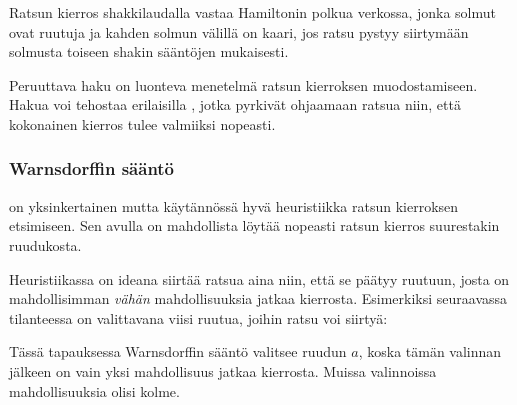 Ratsun kierros shakkilaudalla vastaa Hamiltonin polkua verkossa,
jonka solmut ovat ruutuja ja kahden solmun välillä on kaari,
jos ratsu pystyy siirtymään solmusta toiseen shakin sääntöjen mukaisesti.

Peruuttava haku on luonteva menetelmä ratsun kierroksen muodostamiseen.
Hakua voi tehostaa erilaisilla ,
jotka pyrkivät ohjaamaan ratsua niin, että kokonainen kierros
tulee valmiiksi nopeasti.

\subsubsection{Warnsdorffin sääntö}


 on yksinkertainen mutta käytännössä hyvä heuristiikka
ratsun kierroksen etsimiseen.
Sen avulla on mahdollista löytää nopeasti ratsun kierros
suurestakin ruudukosta.

Heuristiikassa on ideana siirtää ratsua aina niin,
että se päätyy ruutuun, josta on mahdollisimman \emph{vähän}
mahdollisuuksia jatkaa kierrosta.
Esimerkiksi seuraavassa tilanteessa on valittavana
viisi ruutua, joihin ratsu voi siirtyä:
\begin{center}
\end{center}
Tässä tapauksessa Warnsdorffin sääntö valitsee ruudun $a$,
koska tämän valinnan jälkeen on vain yksi mahdollisuus
jatkaa kierrosta. Muissa valinnoissa mahdollisuuksia olisi kolme.


